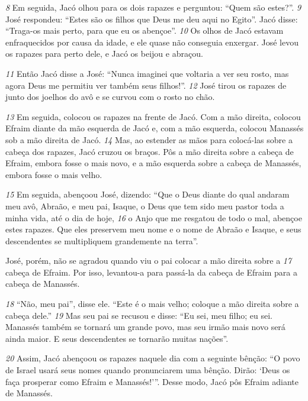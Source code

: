 \bigskip
\textit{\tiny 8} 
Em seguida, Jacó olhou para os dois rapazes e perguntou: “Quem são estes?”. 
\textit{\tiny 9} 
José respondeu: “Estes são os filhos que Deus me deu aqui no Egito”.
  Jacó disse: “Traga-os mais perto, para que eu os abençoe”.
\textit{\tiny 10}
Os olhos de Jacó estavam enfraquecidos por causa da idade, e ele quase não
conseguia enxergar. José levou os rapazes para perto dele, e Jacó os beijou e
abraçou. 

\bigskip
\textit{\tiny 11}
Então Jacó disse a José: “Nunca imaginei que voltaria a ver seu rosto,
mas agora Deus me permitiu ver também seus filhos!”.
\textit{\tiny 12}
José tirou os rapazes de junto dos joelhos do avô e se curvou com o rosto no
chão. 

\bigskip
\textit{\tiny 13}
Em seguida, colocou os rapazes na frente de Jacó. Com a mão direita,
colocou Efraim diante da mão esquerda de Jacó e, com a mão esquerda, colocou
Manassés sob a mão direita de Jacó. 
\textit{\tiny 14}
Mas, ao estender as mãos para colocá-las
sobre a cabeça dos rapazes, Jacó cruzou os braços. Pôs a mão direita sobre a
cabeça de Efraim, embora fosse o mais novo, e a mão esquerda sobre a cabeça de
Manassés, embora fosse o mais velho. 

\bigskip
\textit{\tiny 15}
Em seguida, abençoou José, dizendo:
    “Que o Deus diante do qual andaram
      meu avô, Abraão, e meu pai, Isaque,
    o Deus que tem sido meu pastor
       toda a minha vida, até o dia de hoje,    
\textit{\tiny 16}
o Anjo que me resgatou de todo o mal,
       abençoe estes rapazes.
    Que eles preservem meu nome
       e o nome de Abraão e Isaque,
    e seus descendentes se multipliquem
       grandemente na terra”.

\bigskip
          José, porém, não se agradou quando viu o pai colocar a mão direita sobre a
\textit{\tiny 17}
cabeça de Efraim. Por isso, levantou-a para passá-la da cabeça de Efraim para a
cabeça de Manassés. 

\bigskip
\textit{\tiny 18}
“Não, meu pai”, disse ele. “Este é o mais velho; coloque a
mão direita sobre a cabeça dele.”
\textit{\tiny 19}
Mas seu pai se recusou e disse: “Eu sei, meu filho; eu sei. Manassés também
se tornará um grande povo, mas seu irmão mais novo será ainda maior. E seus
descendentes se tornarão muitas nações”.

\bigskip
\textit{\tiny 20}
Assim, Jacó abençoou os rapazes naquele dia com a seguinte bênção: “O povo
de Israel usará seus nomes quando pronunciarem uma bênção. Dirão: ‘Deus os
faça prosperar como Efraim e Manassés!’”. Desse modo, Jacó pôs Efraim adiante
de Manassés.

